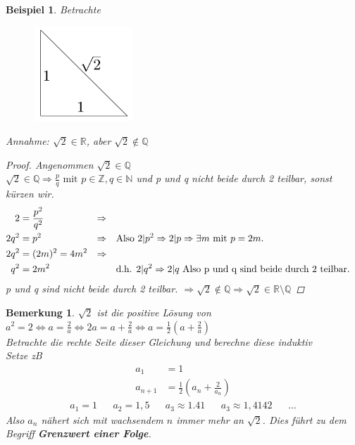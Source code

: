 \documentclass[a4paper,titlepage,oneside]{article}
\def\N{\ensuremath{\mathbb{N}} }
\def\Q{\ensuremath{\mathbb{Q}} }
\def\Z{\ensuremath{\mathbb{Z}} }
\def\R{\ensuremath{\mathbb{R}} }
\def\WSP{\text{Widerspruch! }}
\theoremstyle{thmstyle}
\newtheorem{bsp}[satz]{Beispiel}
\newtheorem{bem}[satz]{Bemerkung}
\theoremstyle{subthmstyle}
\begin{document}
\begin{bsp}
Betrachte
\begin{figure}[ht]\centering
 \includegraphics[width=0.33\textwidth]{images/dreieck_wurzel2.png}
\end{figure}
Annahme: \( \sqrt{2} \in \R\), aber \(\sqrt{2} \not\in \Q\)
\begin{proof} Angenommen $\displaystyle \sqrt{2} \in \Q$ \\
$ \displaystyle \sqrt{2} \in \Q \Rightarrow \frac{p}{q} \text{ mit }p \in \Z, q \in \N $ und p und q nicht beide durch 2 teilbar, sonst kürzen wir.
\begin{align*}
2 &= \frac{p^2}{q^2} &\Rightarrow\\
2q^2 &= p^2 &\Rightarrow &\text{\quad Also } 2 | p^2 \Rightarrow 2 | p \Rightarrow \exists m \text{ mit } p = 2 m. \\
2q^2 &= (2m)^2 = 4m^2 &\Rightarrow \\
q^2 &= 2m^2 && \text{\quad d.h. } 2 | q^2 \Rightarrow 2 | q \text{ Also p und q sind beide durch 2 teilbar.}
\end{align*}
 \WSP p und q sind nicht beide durch 2 teilbar. $\displaystyle \Rightarrow \sqrt{2} \not\in \Q \Rightarrow \sqrt{2} \in \R\setminus\Q$
\end{proof}
\end{bsp}

\begin{bem}
\( \sqrt{2} \) ist die positive Lösung von $ \displaystyle a^2 = 2 \Leftrightarrow a = \frac{2}{a} \Leftrightarrow  2a = a + \frac{2}{a} \Leftrightarrow a= \frac{1}{2}\left(a + \frac{2}{a}\right)$ \\
Betrachte die rechte Seite dieser Gleichung und berechne diese induktiv\\
Setze zB
\begin{align*}
a_1 &= 1\\
a_{n+1} &= \frac{1}{2}\left(a_n + \frac{2}{a_n}\right)
\end{align*}
\begin{align*}
a_1 = 1 && a_2 = 1,5 && a_3 \approx 1.41 && a_3 \approx 1,4142 &&\dots
\end{align*}
Also \(a_n\) nähert sich mit wachsendem \(n\) immer mehr an \(\sqrt{2}\). Dies führt zu dem Begriff \textbf{Grenzwert einer Folge}.
\end{bem}
\end{document}
